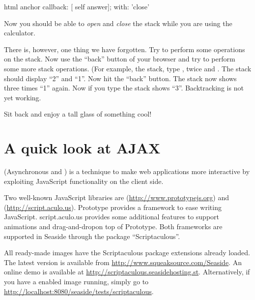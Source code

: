 \documentclass[a4paper,10pt,twoside]{book}
\begin{document}

\begin{code}{}
html anchor
	callback: [ self answer];
	with: 'close'
\end{code}

Now you should be able to \emph{open} and \emph{close} the stack while you are using the
calculator.

There is, however, one thing we have forgotten.
Try to perform some operations on the stack.
Now use the ``back'' button of your browser and try to perform some more stack
operations.
(For example,  the stack, type ,  twice and \menu {+}.
The stack should display ``2'' and ``1''.
Now hit the ``back'' button.
The stack now shows three times ``1'' again.
Now if you type \menu{+} the stack shows ``3''.
Backtracking is not yet working.


Sit back and enjoy a tall glass of something cool!

\section{A quick look at AJAX}


 (Asynchronous  and ) is a technique to make web
applications more interactive by exploiting JavaScript functionality on the client side.

Two well-known JavaScript libraries are 
(\url{http://www.prototypejs.org}) and 
(\url{http://script.aculo.us}).
Prototype provides a framework to ease writing JavaScript.
script.aculo.us provides some additional features to support animations and drag-and-dropon top of Prototype.
Both frameworks are supported in Seaside through the package ``Scriptaculous''.

All ready-made images have the Scriptaculous package extensions already loaded.
The latest version is available from \url{http://www.squeaksource.com/Seaside}.
An online demo is available at \url{http://scriptaculous.seasidehosting.st}.
Alternatively, if you have a enabled image running, simply go to
\url{http://localhost:8080/seaside/tests/scriptaculous}.
\end{document}
